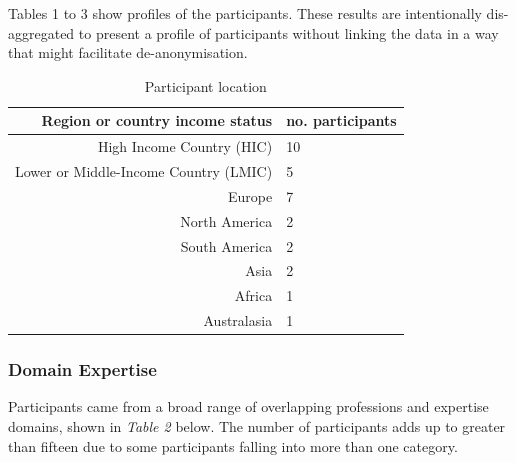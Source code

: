\documentclass{CUP-JNL-DAP}%
\begin{document}
Tables 1 to 3 show profiles of the participants. These results are intentionally dis-aggregated to present a profile of participants without linking the data in a way that might facilitate de-anonymisation.

\begin{table}[h!]
  \begin{center}
    \caption{Participant location}
    \label{tab:locations}
    \begin{tabular}{r|l} %
      \textbf{Region or country income status} & \textbf{no. participants} \\
      \hline
        High Income Country (HIC)&10\\
        Lower or Middle-Income Country (LMIC) &5 \\
        \hline
        Europe&7\\
        North America&2\\
        South America&2\\
        Asia&2\\
        Africa&1\\
        Australasia&1\\
    \end{tabular}
  \end{center}
\end{table}


\subsubsection{Domain Expertise}

Participants came from a broad range of overlapping professions and expertise domains, shown in \textit{Table 2} below.  The number of participants adds up to greater than fifteen due to some participants falling into more than one category.  
\end{document}
